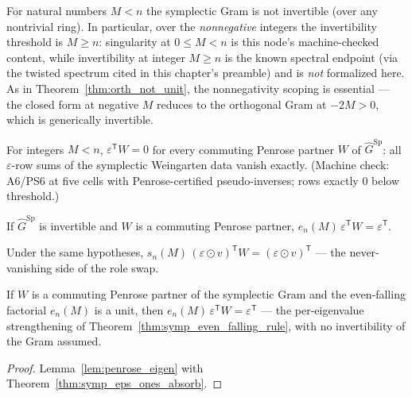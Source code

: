 \begin{theorem}\label{thm:symp_not_unit}
\leanok
{}
For natural numbers $M<n$ the symplectic Gram is not invertible (over any
nontrivial ring). In particular, over the \emph{nonnegative} integers the
invertibility threshold is $M\ge n$: singularity at $0\le M<n$ is this
node's machine-checked content, while invertibility at integer $M\ge n$
is the known spectral endpoint (via the twisted spectrum cited in this
chapter's preamble) and is \emph{not} formalized here. As in
Theorem~\ref{thm:orth_not_unit}, the nonnegativity scoping is essential
--- the closed form at negative $M$ reduces to the orthogonal Gram at
$-2M>0$, which is generically invertible.
\end{theorem}

\begin{theorem}\label{thm:symp_vanish_below}
\leanok
{}
For integers $M<n$,
$\varepsilon^{\mathsf T}W = 0$ for every commuting Penrose partner $W$ of
$\widehat G^{\mathrm{Sp}}$: all $\varepsilon$-row sums of the symplectic
Weingarten data vanish exactly. (Machine check: A6/PS6 at five cells with
Penrose-certified pseudo-inverses; rows exactly $0$ below threshold.)
\end{theorem}

\begin{theorem}\label{thm:symp_even_falling_rule}
\leanok
{}
If $\widehat G^{\mathrm{Sp}}$ is invertible and $W$ is a commuting Penrose
partner, $e_n(M)\,\varepsilon^{\mathsf T}W = \varepsilon^{\mathsf T}$.
\end{theorem}

\begin{theorem}\label{thm:symp_rising_shift_rule}
\leanok
{}
Under the same hypotheses, $s_n(M)\,(\varepsilon\odot v)^{\mathsf T}W
= (\varepsilon\odot v)^{\mathsf T}$ --- the never-vanishing side of the
role swap.
\end{theorem}

\begin{theorem}\label{thm:symp_even_falling_rule_eigen}
\leanok
{}
If $W$ is a commuting Penrose partner of the symplectic Gram and the
even-falling factorial $e_n(M)$ is a unit, then
$e_n(M)\,\varepsilon^{\mathsf T}W = \varepsilon^{\mathsf T}$ --- the
per-eigenvalue strengthening of
Theorem~\ref{thm:symp_even_falling_rule}, with no invertibility of the
Gram assumed.
\end{theorem}
\begin{proof}
\leanok
{}
Lemma~\ref{lem:penrose_eigen} with
Theorem~\ref{thm:symp_eps_ones_absorb}.
\end{proof}

